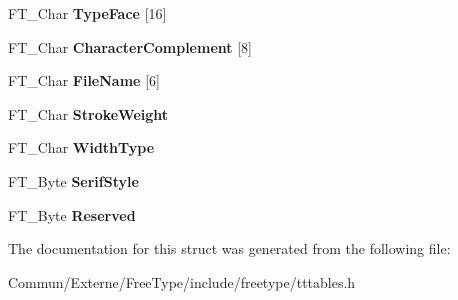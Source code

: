 \begin{DoxyCompactItemize}
\item 
F\+T\+\_\+\+Char {\bfseries Type\+Face} \mbox{[}16\mbox{]}\hypertarget{struct_t_t___p_c_l_t___a47c2c6b276f3ab2002fe03af41dad396}{}\label{struct_t_t___p_c_l_t___a47c2c6b276f3ab2002fe03af41dad396}

\item 
F\+T\+\_\+\+Char {\bfseries Character\+Complement} \mbox{[}8\mbox{]}\hypertarget{struct_t_t___p_c_l_t___a2641686beb550bcf8d9e598336f0acd9}{}\label{struct_t_t___p_c_l_t___a2641686beb550bcf8d9e598336f0acd9}

\item 
F\+T\+\_\+\+Char {\bfseries File\+Name} \mbox{[}6\mbox{]}\hypertarget{struct_t_t___p_c_l_t___a87691bde7cb06e3043f5320c8223e768}{}\label{struct_t_t___p_c_l_t___a87691bde7cb06e3043f5320c8223e768}

\item 
F\+T\+\_\+\+Char {\bfseries Stroke\+Weight}\hypertarget{struct_t_t___p_c_l_t___aaf28b05ac07bcdc1ae6f4ec9064434fc}{}\label{struct_t_t___p_c_l_t___aaf28b05ac07bcdc1ae6f4ec9064434fc}

\item 
F\+T\+\_\+\+Char {\bfseries Width\+Type}\hypertarget{struct_t_t___p_c_l_t___ad6613ad7556599343f999a7d27a0f1d0}{}\label{struct_t_t___p_c_l_t___ad6613ad7556599343f999a7d27a0f1d0}

\item 
F\+T\+\_\+\+Byte {\bfseries Serif\+Style}\hypertarget{struct_t_t___p_c_l_t___aa8e3d35937660a1e4959ee10a4800e6a}{}\label{struct_t_t___p_c_l_t___aa8e3d35937660a1e4959ee10a4800e6a}

\item 
F\+T\+\_\+\+Byte {\bfseries Reserved}\hypertarget{struct_t_t___p_c_l_t___a2e46e3f5eaa51e02d831d3f6143f8846}{}\label{struct_t_t___p_c_l_t___a2e46e3f5eaa51e02d831d3f6143f8846}

\end{DoxyCompactItemize}


The documentation for this struct was generated from the following file\+:\begin{DoxyCompactItemize}
\item 
Commun/\+Externe/\+Free\+Type/include/freetype/tttables.\+h\end{DoxyCompactItemize}
